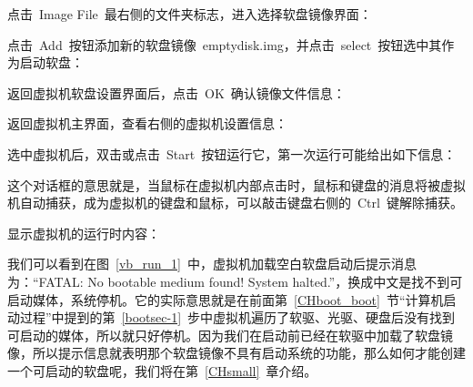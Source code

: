 点击~Image File~最右侧的文件夹标志，进入选择软盘镜像界面：\\

点击~Add~按钮添加新的软盘镜像~emptydisk.img，并点击~select~按钮选中其作为启动软盘：\\

返回虚拟机软盘设置界面后，点击~OK~确认镜像文件信息：\\

返回虚拟机主界面，查看右侧的虚拟机设置信息：\\

选中虚拟机后，双击或点击~Start~按钮运行它，第一次运行可能给出如下信息：\\

这个对话框的意思就是，当鼠标在虚拟机内部点击时，鼠标和键盘的消息将被虚拟机自动捕获，成为虚拟机的键盘和鼠标，可以敲击键盘右侧的~Ctrl~键解除捕获。

显示虚拟机的运行时内容：\\

我们可以看到在图~\ref{vb_run_1}~中，虚拟机加载空白软盘启动后提示消息为：“FATAL: No bootable medium found! System halted.”，换成中文是找不到可启动媒体，系统停机。它的实际意思就是在前面第~\ref{CHboot_boot}~节“计算机启动过程”中提到的第~\ref{bootsec-1}~步中虚拟机遍历了软驱、光驱、硬盘后没有找到可启动的媒体，所以就只好停机。因为我们在启动前已经在软驱中加载了软盘镜像，所以提示信息就表明那个软盘镜像不具有启动系统的功能，那么如何才能创建一个可启动的软盘呢，我们将在第~\ref{CHsmall}~章介绍。

